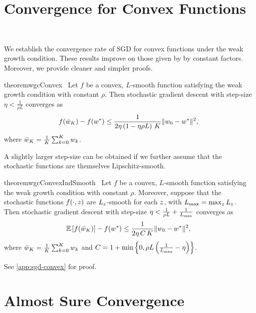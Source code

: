 \section{Convergence for Convex Functions}~\label{sec:sgd-convex}

We establish the convergence rate of SGD for convex functions under the weak growth condition. These results improve on those given by \citet{vaswani2019fast} by constant factors. 
Moreover, we provide cleaner and simpler proofs.


\begin{restatable}{theorem}{wgcConvex}~\label{thm:wgc-convex}
    Let \( f \) be a convex, \( L \)-smooth function satisfying the weak growth condition with constant \( \rho  \).
    Then stochastic gradient descent with step-size \( \eta < \frac{1}{\rho L} \) converges as
    \[ f(\bar {w}_K) - f(w^*) \leq \frac{1}{2 \eta \left(1 - \eta \rho L\right) \, K} \|w_0 - w^*\|^2, \]
    where \( \bar {w}_K = \frac{1}{K} \sum_{k=0}^K w_k \). 
\end{restatable}

A slightly larger step-size can be obtained if we further assume that the stochastic functions are themselves Lipschitz-smooth.

\begin{restatable}{theorem}{wgcConvexIndSmooth}~\label{thm:wgc-convex-ind-smooth}
    Let \( f \) be a convex, \( L \)-smooth function satisfying the weak growth condition with constant \( \rho  \).
    Moreover, suppose that the stochastic functions \( f(\cdot, z) \) are \( L_z \)-smooth for each \( z \), with \( L_{\text{max}} = \max_z L_z \).
    Then stochastic gradient descent with step-size \( \eta < \frac{1}{\rho L} + \frac{1}{L_{\text{max}}} \) converges as
    \[ \mathbb{E}\left[f(\bar w_K)\right] - f(w^*) \leq \frac{1}{2\eta \, C \, K} \|w_0 - w^*\|^2,   \]
    where \( \bar {w}_K = \frac{1}{K} \sum_{k=0}^K w_k \) and \( C = 1 + \min \left\{ 0, \rho L \left(\frac{1}{L_{\text{max}}} - \eta \right)\right\} \). 
\end{restatable}

See \autoref{app:sgd-convex} for proof.

\section{Almost Sure Convergence}

\endinput
